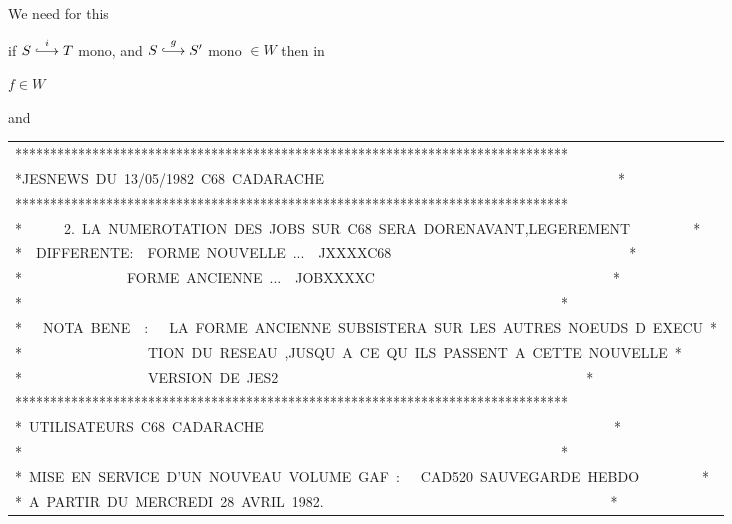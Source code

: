 We need for this

if $S\overset{i}{\lhook\joinrel\longrightarrow}T$ mono, and $S\overset{g}{\lhook\joinrel\longrightarrow}S'$ mono $\in W$ then in


$f\in W$

and


{\scriptsize\ttfamily\begin{tabular}{@{}l@{}}
*******************************************************************************\\
*JESNEWS~DU~13/05/1982~C68~CADARACHE~~~~~~~~~~~~~~~~~~~~~~~~~~~~~~~~~~~~~~~~~~*\\
*******************************************************************************\\
*~~~~~~2.~LA~NUMEROTATION~DES~JOBS~SUR~C68~SERA~DORENAVANT,LEGEREMENT~~~~~~~~~*\\
*~~DIFFERENTE:~~FORME~NOUVELLE~...~~JXXXXC68~~~~~~~~~~~~~~~~~~~~~~~~~~~~~~~~~~*\\
*~~~~~~~~~~~~~~~FORME~ANCIENNE~...~~JOBXXXXC~~~~~~~~~~~~~~~~~~~~~~~~~~~~~~~~~~*\\
*~~~~~~~~~~~~~~~~~~~~~~~~~~~~~~~~~~~~~~~~~~~~~~~~~~~~~~~~~~~~~~~~~~~~~~~~~~~~~*\\
*~~~NOTA~BENE~~:~~~LA~FORME~ANCIENNE~SUBSISTERA~SUR~LES~AUTRES~NOEUDS~D~EXECU~*\\
*~~~~~~~~~~~~~~~~~~TION~DU~RESEAU~,JUSQU~A~CE~QU~ILS~PASSENT~A~CETTE~NOUVELLE~*\\
*~~~~~~~~~~~~~~~~~~VERSION~DE~JES2~~~~~~~~~~~~~~~~~~~~~~~~~~~~~~~~~~~~~~~~~~~~*\\
*******************************************************************************\\
*~UTILISATEURS~C68~CADARACHE~~~~~~~~~~~~~~~~~~~~~~~~~~~~~~~~~~~~~~~~~~~~~~~~~~*\\
*~~~~~~~~~~~~~~~~~~~~~~~~~~~~~~~~~~~~~~~~~~~~~~~~~~~~~~~~~~~~~~~~~~~~~~~~~~~~~*\\
*~MISE~EN~SERVICE~D'UN~NOUVEAU~VOLUME~GAF~:~~~CAD520~SAUVEGARDE~HEBDO~~~~~~~~~*\\
*~A~PARTIR~DU~MERCREDI~28~AVRIL~1982.~~~~~~~~~~~~~~~~~~~~~~~~~~~~~~~~~~~~~~~~~*\\

\end{tabular}}
